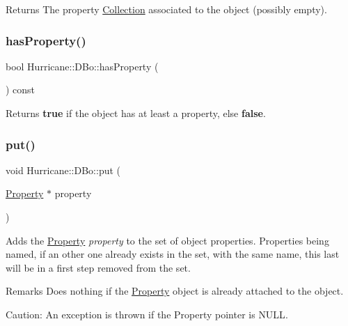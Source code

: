 \begin{DoxyReturn}{Returns}
The property \mbox{\hyperlink{classHurricane_1_1Collection}{Collection}} associated to the object (possibly empty). 
\end{DoxyReturn}
\mbox{\label{classHurricane_1_1DBo_a1563f094565030c77592ed82f9a9989b}} 
\subsubsection{\texorpdfstring{has\+Property()}{hasProperty()}}
{\footnotesize\ttfamily bool Hurricane\+::\+D\+Bo\+::has\+Property (\begin{DoxyParamCaption}{ }\end{DoxyParamCaption}) const\hspace{0.3cm}{\ttfamily [inline]}}

\begin{DoxyReturn}{Returns}
{\bfseries true} if the object has at least a property, else {\bfseries false}. 
\end{DoxyReturn}
\mbox{\label{classHurricane_1_1DBo_a8979674f11507cb4c7c5251b41ed72d5}} 
\subsubsection{\texorpdfstring{put()}{put()}}
{\footnotesize\ttfamily void Hurricane\+::\+D\+Bo\+::put (\begin{DoxyParamCaption}\item[{\mbox{\hyperlink{classHurricane_1_1Property}{Property}} $\ast$}]{property }\end{DoxyParamCaption})}

Adds the \mbox{\hyperlink{classHurricane_1_1Property}{Property}} {\itshape property} to the set of object properties. Properties being named, if an other one already exists in the set, with the same name, this last will be in a first step removed from the set.

\begin{DoxyRemark}{Remarks}
Does nothing if the \mbox{\hyperlink{classHurricane_1_1Property}{Property}} object is already attached to the object.
\end{DoxyRemark}
\begin{DoxyParagraph}{Caution\+: An exception is thrown if the Property pointer is {\ttfamily N\+U\+LL}.}

\end{DoxyParagraph}
\mbox{\label{classHurricane_1_1DBo_a7833a1f0b8c704930bdc00861e63cf5e}} 

